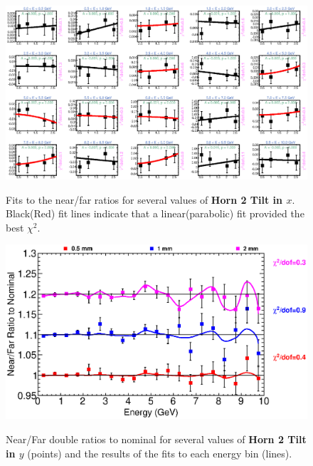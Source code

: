 {\begin{figure}[ht]
  \begin{center}
    {\includegraphics[width=5.0in]{figures/Horn2XTilt_nof_fits.eps}}
  \end{center}
\caption{ Fits to the near/far ratios for several values of {\bf Horn 2 Tilt in $x$}. Black(Red) fit lines indicate that a linear(parabolic) fit provided the best $\chi^2$. }
\end{figure}

\begin{figure}[ht]
  \begin{center}
    {\includegraphics[width=6.0in]{figures/Horn2YTilt_nof_summary.eps}}
  \end{center}
\caption{ Near/Far double ratios to nominal for several values of {\bf Horn 2 Tilt in $y$} (points) and the results of the fits to each energy bin (lines).}
\end{figure}

}
